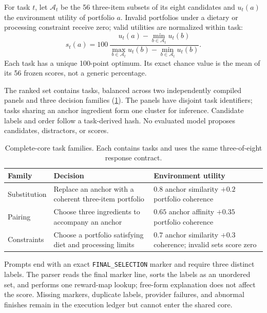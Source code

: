 \documentclass{article}
\begin{document}
For task $t$, let $\mathcal{A}_t$ be the 56 three-item subsets of its eight candidates and
$u_t(a)$ the environment utility of portfolio $a$. Invalid portfolios under a dietary or processing
constraint receive zero; valid utilities are normalized within task:
\begin{equation}
 s_t(a)=100\,\frac{u_t(a)-\min_{b\in\mathcal{A}_t}u_t(b)}
 {\max_{b\in\mathcal{A}_t}u_t(b)-\min_{b\in\mathcal{A}_t}u_t(b)}.
 \label{eq:task-score}
\end{equation}
Each task has a unique 100-point optimum. Its exact chance value is the mean of its 56 frozen
scores, not a generic percentage.

The ranked set contains \FBTasks{} tasks, balanced across two independently compiled panels and
three decision families (\cref{tab:families}). The panels have disjoint task identifiers; tasks
sharing an anchor ingredient form one cluster for inference. Candidate labels and order follow a
task-derived hash. No evaluated model proposes candidates, distractors, or scores.

\begin{table}[t]
  \caption{Complete-core task families. Each contains \FBTasksPerFamily{} tasks and uses the same
  three-of-eight response contract.}
  \label{tab:families}
  \centering
  \small
  \setlength{\tabcolsep}{4pt}
  \begin{tabularx}{\linewidth}{@{}l X X@{}}
    \toprule
    Family & Decision & Environment utility \\
    \midrule
    Substitution & Replace an anchor with a coherent three-item portfolio &
      $0.8$ anchor similarity $+0.2$ portfolio coherence \\
    Pairing & Choose three ingredients to accompany an anchor &
      $0.65$ anchor affinity $+0.35$ portfolio coherence \\
    Constraints & Choose a portfolio satisfying diet and processing limits &
      $0.7$ anchor similarity $+0.3$ coherence; invalid sets score zero \\
    \bottomrule
  \end{tabularx}
\end{table}

Prompts end with an exact \texttt{FINAL\_SELECTION} marker and require three distinct labels. The
parser reads the final marker line, sorts the labels as an unordered set, and performs one reward-map
lookup; free-form explanation does not affect the score. Missing markers, duplicate labels,
provider failures, and abnormal finishes remain in the execution ledger but cannot enter the
shared core.
\end{document}
